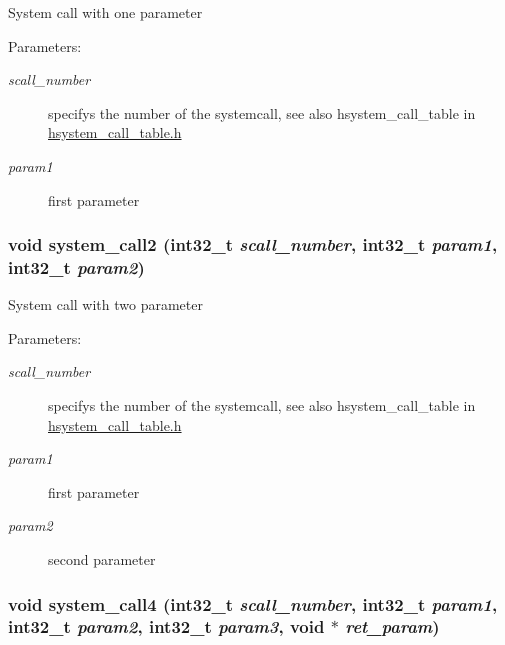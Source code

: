 System call with one parameter \begin{Desc}
\item[Parameters:]
\begin{description}
\item[{\em scall\_\-number}]specifys the number of the systemcall, see also hsystem\_\-call\_\-table in \hyperlink{hsystem__call__table_8h}{hsystem\_\-call\_\-table.h} \item[{\em param1}]first parameter \end{description}
\end{Desc}
\hypertarget{group___h_s_y_s_t_e_m___a_p_i_g33d0bfaec0c957c63e5eecd9b2957a21}{
\subsubsection[{system\_\-call2}]{\setlength{\rightskip}{0pt plus 5cm}void system\_\-call2 (int32\_\-t {\em scall\_\-number}, \/  int32\_\-t {\em param1}, \/  int32\_\-t {\em param2})}}
\label{group___h_s_y_s_t_e_m___a_p_i_g33d0bfaec0c957c63e5eecd9b2957a21}


System call with two parameter \begin{Desc}
\item[Parameters:]
\begin{description}
\item[{\em scall\_\-number}]specifys the number of the systemcall, see also hsystem\_\-call\_\-table in \hyperlink{hsystem__call__table_8h}{hsystem\_\-call\_\-table.h} \item[{\em param1}]first parameter \item[{\em param2}]second parameter \end{description}
\end{Desc}
\hypertarget{group___h_s_y_s_t_e_m___a_p_i_gb225a2aa0d2d8bcaa2536fa20c5a5a58}{
\subsubsection[{system\_\-call4}]{\setlength{\rightskip}{0pt plus 5cm}void system\_\-call4 (int32\_\-t {\em scall\_\-number}, \/  int32\_\-t {\em param1}, \/  int32\_\-t {\em param2}, \/  int32\_\-t {\em param3}, \/  void $\ast$ {\em ret\_\-param})}}
\label{group___h_s_y_s_t_e_m___a_p_i_gb225a2aa0d2d8bcaa2536fa20c5a5a58}


